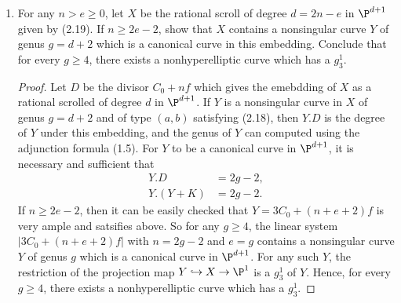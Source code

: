 \documentclass[a4paper]{article}
\begin{document}
\begin{enumerate} [label=\textbf{\arabic*.}, leftmargin=0em]
\begin{proof}
              If $Y$ has odd degree, say $\deg{Y} = 2a + 1$, then $Y$ is contained in a surface of degree $a + 1$.
              If $Z$ is any such surface in $\P^3$, by (I, 7.7) $X_0 \cap Z$ has two irreducible components each of multiplicity one, consisting of $Y$ and a line $L$ in $\P^3$.
              The latter must be a member of the one-dimensional family of lines in $X_0$ which go through the vertex $P_0$, and the inverse image $\pi^*L = L \times_{X_0} X$ of any of these lines is linearly eqiuvalent to $C_0 + f$, which means $$Y \sim (a + 1)(C_0 + 2f) - (C_0 + f) = aC_0 + (2a + 1)f.$$
              To conclude, we can compute the genus of $Y$ using the adjunction formula of (1.5)
              \begin{equation*}
                  g = \frac{1}{2}Y.(Y + K) + 1 = a^2 - a.
              \end{equation*}
          \end{proof}

    \item For any $n > e \geq 0$, let $X$ be the rational scroll of degree $d = 2n - e$ in $\P^{d + 1}$ given by (2.19).
          If $n \geq 2e - 2$, show that $X$ contains a nonsingular curve $Y$ of genus $g = d + 2$ which is a canonical curve in this embedding.
          Conclude that for every $g \geq 4$, there exists a nonhyperelliptic curve which has a $g_3^1$.

          \begin{proof}
              Let $D$ be the divisor $C_0 + nf$ which gives the emebdding of $X$ as a rational scrolled of degree $d$ in $\P^{d + 1}$.
              If $Y$ is a nonsingular curve in $X$ of genus $g = d + 2$ and of type $(a, b)$ satisfying (2.18), then $Y.D$ is the degree of $Y$ under this embedding, and the genus of $Y$ can computed using the adjunction formula (1.5).
              For $Y$ to be a canonical curve in $\P^{d + 1}$, it is necessary and sufficient that
              \begin{align*}
                  Y.D       & = 2g - 2, \\
                  Y.(Y + K) & = 2g - 2.
              \end{align*}
              If $n \geq 2e - 2$, then it can be easily checked that $Y = 3C_0 + (n + e + 2)f$ is very ample and satsifies above.
              So for any $g \geq 4$, the linear system $|3C_0 + (n + e+ 2)f|$ with $n = 2g - 2$ and $e = g$ contains a nonsingular curve $Y$ of genus $g$ which is a canonical curve in $\P^{d + 1}$.
              For any such $Y$, the restriction of the projection map $Y \hookrightarrow X \to \P^1$ is a $g^1_3$ of $Y$.
              Hence, for every $g \geq 4$, there exists a nonhyperelliptic curve which has a $g^1_3$.
          \end{proof}


\end{enumerate}
\end{document}
